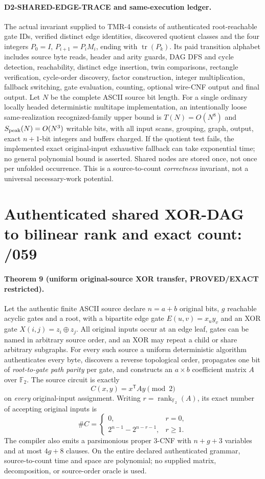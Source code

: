 \documentclass[11pt]{article}
\begin{document}
\paragraph{D2-SHARED-EDGE-TRACE and same-execution ledger.}
The actual invariant supplied to TMR-4 consists of authenticated root-reachable gate IDs, verified distinct edge identities, discovered quotient classes and the four integers $P_0=I$, $P_{i+1}=P_iM_i$, ending with $\operatorname{tr}(P_k)$. Its paid transition alphabet includes source byte reads, header and arity guards, DAG DFS and cycle detection, reachability, distinct edge insertion, twin comparisons, rectangle verification, cycle-order discovery, factor construction, integer multiplication, fallback switching, gate evaluation, counting, optional wire-CNF output and final output. Let $N$ be the complete ASCII source bit length. For a single ordinary locally headed deterministic multitape implementation, an intentionally loose same-realization recognized-family upper bound is $T(N)=O(N^8)$ and $S_{\rm peak}(N)=O(N^3)$ writable bits, with all input scans, grouping, graph, output, exact $n+1$-bit integers and buffers charged. If the quotient test fails, the implemented exact original-input exhaustive fallback can take exponential time; no general polynomial bound is asserted. Shared nodes are stored once, not once per unfolded occurrence. This is a source-to-count \emph{correctness} invariant, not a universal necessary-work potential.


\section{Authenticated shared XOR-DAG to bilinear rank and exact count: /059}
\paragraph{Theorem 9 (uniform original-source XOR transfer, PROVED/EXACT restricted).}
Let the authentic finite ASCII source declare $n=a+b$ original bits, $g$ reachable acyclic gates and a root, with a bipartite edge gate $E(u,v)=x_u y_v$ and an XOR gate $X(i,j)=z_i\oplus z_j$. All original inputs occur at an edge leaf, gates can be named in arbitrary source order, and an XOR may repeat a child or share arbitrary subgraphs. For every such source a uniform deterministic algorithm authenticates every byte, discovers a reverse topological order, propagates one bit of \emph{root-to-gate path parity} per gate, and constructs an $a\times b$ coefficient matrix $A$ over $\mathbb F_2$. The source circuit is exactly
\[
C(x,y)=x^{\mathsf T}Ay\pmod2
\]
on \emph{every} original-input assignment. Writing $r=\operatorname{rank}_{\mathbb F_2}(A)$, its exact number of accepting original inputs is
\[
\#C=\begin{cases}
0,&r=0,\\
2^{n-1}-2^{n-r-1},&r\ge1.
\end{cases}
\]
The compiler also emits a parsimonious proper 3-CNF with $n+g+3$ variables and at most $4g+8$ clauses. On the entire declared authenticated grammar, source-to-count time and space are polynomial; no supplied matrix, decomposition, or source-order oracle is used.
\end{document}
